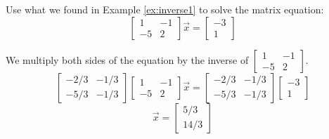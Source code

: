 \documentclass{ximera}
\begin{document}
\begin{example}\label{ex:inverse2} Use what we found in Example \ref{ex:inverse1} to solve the matrix equation:
$$\begin{bmatrix}1 & -1\\-5 & 2\end{bmatrix}\vec{x}=\begin{bmatrix}-3\\1\end{bmatrix}$$
\begin{explanation}
We multiply both sides of the equation by the inverse of $\begin{bmatrix}1 & -1\\-5 & 2\end{bmatrix}$.
$$\begin{bmatrix}-2/3 & -1/3\\-5/3 & -1/3\end{bmatrix}\begin{bmatrix}1 & -1\\-5 & 2\end{bmatrix}\vec{x}=\begin{bmatrix}-2/3 & -1/3\\-5/3 & -1/3\end{bmatrix}\begin{bmatrix}-3\\1\end{bmatrix}$$
$$\vec{x}=\begin{bmatrix}5/3\\14/3\end{bmatrix}$$
\end{explanation}
\end{example}
\end{document}
